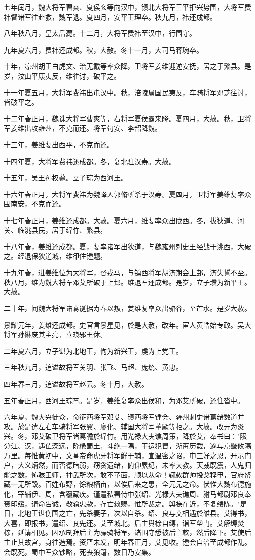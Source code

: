 \documentclass[12pt,UTF8]{ctexbook}
\begin{document}
七年闰月，魏大将军曹爽、夏侯玄等向汉中，镇北大将军王平拒兴势围，大将军费祎督诸军往赴救，魏军退。夏四月，安平王理卒。秋九月，祎还成都。

八年秋八月，皇太后薨。十二月，大将军费祎至汉中，行围守。

九年夏六月，费祎还成都。秋，大赦。冬十一月，大司马蒋琬卒。

十年，凉州胡王白虎文、治无戴等率众降，卫将军姜维迎逆安抚，居之于繁县。是岁，汶山平康夷反，维往讨，破平之。

十一年夏五月，大将军费祎出屯汉中。秋，涪陵属国民夷反，车骑将军邓芝往讨，皆破平之。

十二年春正月，魏诛大将军曹爽等，右将军夏侯霸来降。夏四月，大赦。秋，卫将军姜维出攻雍州，不克而还。将军句安、李韶降魏。

十三年，姜维复出西平，不克而还。

十四年夏，大将军费祎还成都。冬，复北驻汉寿。大赦。

十五年，吴王孙权薨。立子琮为西河王。

十六年春正月，大将军费祎为魏降人郭脩所杀于汉寿。夏四月，卫将军姜维复率众围南安，不克而还。

十七年春正月，姜维还成都。大赦。夏六月，维复率众出陇西。冬，拔狄道、河关、临洮县民，居于绵竹、繁县。

十八年春，姜维还成都。夏，复率诸军出狄道，与魏雍州刺史王经战于洮西，大破之。经退保狄道城，维卻住锺题。

十九年春，进姜维位为大将军，督戎马，与镇西将军胡济期会上邽，济失誓不至。秋八月，维为魏大将军邓艾所破于上邽。维退军还成都。是岁，立子瓒为新平王。大赦。

二十年，闻魏大将军诸葛诞据寿春以叛，姜维复率众出骆谷，至芒水。是岁大赦。

景耀元年，姜维还成都。史官言景星见，於是大赦，改年。宦人黄皓始专政。吴大将军孙綝废其主亮，立琅邪王休。

二年夏六月，立子谌为北地王，恂为新兴王，虔为上党王。

三年秋九月，追谥故将军关羽、张飞、马超、庞统、黄忠。

四年春三月，追谥故将军赵云。冬十月，大赦。

五年春正月，西河王琮卒。是岁，姜维复率众出侯和，为邓艾所破，还住沓中。

六年夏，魏大兴徒众，命征西将军邓艾、镇西将军锺会、雍州刺史诸葛绪数道并攻。於是遣左右车骑将军张翼、廖化、辅国大将军董厥等拒之。大赦。改元为炎兴。冬，邓艾破卫将军诸葛瞻於绵竹。用光禄大夫谯周策，降於艾，奉书曰："限分江、汉，遇值深远，阶缘蜀土，斗绝一隅，干运犯冒，渐苒历载，遂与京畿攸隔万里。每惟黄初中，文皇帝命虎牙将军鲜于辅，宣温密之诏，申三好之恩，开示门户，大义炳然，而否德暗弱，窃贪遗绪，俯仰累纪，未率大教。天威既震，人鬼归能之数，怖骇王师，神武所次，敢不革面，顺以从命！辄敕群帅投戈释甲，官府帑藏一无所毁。百姓布野，馀粮栖亩，以俟后来之惠，全元元之命。伏惟大魏布德施化，宰辅伊、周，含覆藏疾。谨遣私署侍中张绍、光禄大夫谯周、驸马都尉邓良奉赍印缓，请命告诚，敬输忠款，存亡敕赐，惟所裁之。舆榇在近，不复缕陈。"是日，北地王谌伤国之亡，先杀妻子，次以自杀。绍、良与艾相遇於雒县。艾得书，大喜，即报书，遣绍、良先还。艾至城北，后主舆榇自缚，诣军垒门。艾解缚焚榇，延请相见。因承制拜后主为骠骑将军。诸围守悉被后主敕，然后降下。艾使后主止其故宫，身往造焉。资严未发，明年春正月，艾见收。锺会自涪至成都作乱。会既死，蜀中军众钞略，死丧狼籍，数日乃安集。
\end{document}
